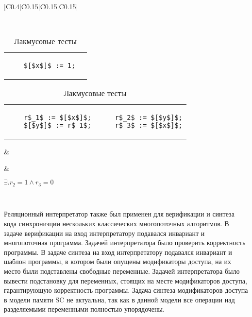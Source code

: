 \begin{table}
\begin{tabular}{|C{0.4\textwidth}|C{0.15\textwidth}|C{0.15\textwidth}|C{0.15\textwidth}|}
    \\ \hline
    
      \\ \hline
    
    \begin{tabular}{@{\hskip -15pt}l @{\hskip 5pt} @{\hskip -15pt}l}
    \begin{lstlisting}
    $[$x$]$ := 1;
    \end{lstlisting}
    &

    \end{tabular}
    
    \vspace{5pt}
    
    \begin{tabular}{@{\hskip -15pt}l|@{\hskip 5pt}|@{\hskip -15pt}l}
    \begin{lstlisting}
    r$_1$ := $[$x$]$;
    $[$y$]$ := r$_1$;
    \end{lstlisting}
    &
    \begin{lstlisting}
    r$_2$ := $[$y$]$;
    r$_3$ := $[$x$]$;
    \end{lstlisting}
    \end{tabular}  
    
    &
    
    
    &
    
    $\exists. r_2 = 1 \wedge r_3 = 0 $
    
    \\ \hline
    
    \end{tabular}
    \egroup
    
\caption{Лакмусовые тесты}
\label{tab:litmus}
\end{table}

Реляционный интерпретатор также был применен для верификации 
и синтеза кода синхронизции нескольких классических многопоточных алгоритмов.
В задаче верификации на вход интерпретатору подавался инвариант и многопоточная программа.
Задачей интерпретатора было проверить корректность программы. 
В задаче синтеза на вход интерпретатору подавался инвариант и шаблон программы,
в котором были опущены модификаторы доступа, 
на их место были подставлены свободные переменные.
Задачей интерпретатора было вывести подстановку для переменных,
стоящих на месте модификаторов доступа, 
гарантирующую корректность программы.
Задача синтеза модификаторов доступа в модели памяти SC не актуальна,
так как в данной модели все операции над разделяемыми переменными полностью упорядочены.

